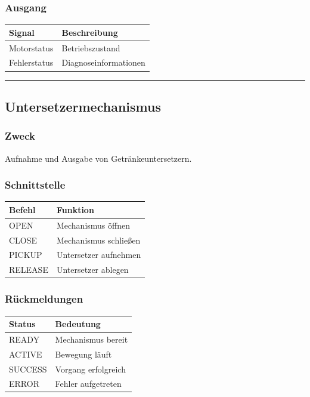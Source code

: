 \documentclass[
  a4paper,
  12pt,
  DIV=12,        %
  parskip=half,  %
  headings=small %
]{scrartcl}
\theoremstyle{definition}
\theoremstyle{definition}
\begin{document}
\subsubsection{Ausgang}\label{ausgang}

\begin{longtable}[]{@{}ll@{}}
\toprule\noalign{}
Signal & Beschreibung \\
\midrule\noalign{}
\endhead
\bottomrule\noalign{}
\endlastfoot
Motorstatus & Betriebszustand \\
Fehlerstatus & Diagnoseinformationen \\
\end{longtable}

\begin{center}\rule{0.5\linewidth}{0.5pt}\end{center}

\subsection{Untersetzermechanismus}\label{untersetzermechanismus-1}

\subsubsection{Zweck}\label{zweck-4}

Aufnahme und Ausgabe von Getränkeuntersetzern.

\subsubsection{Schnittstelle}\label{schnittstelle-4}

\begin{longtable}[]{@{}ll@{}}
\toprule\noalign{}
Befehl & Funktion \\
\midrule\noalign{}
\endhead
\bottomrule\noalign{}
\endlastfoot
OPEN & Mechanismus öffnen \\
CLOSE & Mechanismus schließen \\
PICKUP & Untersetzer aufnehmen \\
RELEASE & Untersetzer ablegen \\
\end{longtable}

\subsubsection{Rückmeldungen}\label{ruxfcckmeldungen}

\begin{longtable}[]{@{}ll@{}}
\toprule\noalign{}
Status & Bedeutung \\
\midrule\noalign{}
\endhead
\bottomrule\noalign{}
\endlastfoot
READY & Mechanismus bereit \\
ACTIVE & Bewegung läuft \\
SUCCESS & Vorgang erfolgreich \\
ERROR & Fehler aufgetreten \\
\end{longtable}
\end{document}
